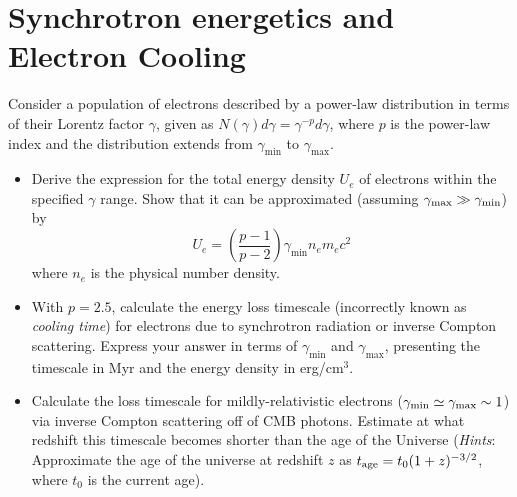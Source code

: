 \section{Synchrotron energetics and Electron Cooling}

Consider a population of electrons described by a power-law distribution in terms of their Lorentz factor $\gamma$, given as $N(\gamma)d\gamma = \gamma^{-p}d\gamma$, where $p$ is the power-law index and the distribution extends from $\gamma_{\text{min}}$ to $\gamma_{\text{max}}$.

\begin{itemize}
\item Derive the expression for the total energy density $U_e$ of electrons within the specified $\gamma$ range. Show that it can be approximated (assuming $\gamma_{\rm max} \gg \gamma_{\rm min}$) by $$U_e = \left(\frac{p-1}{p-2}\right) \gamma_{\text{min}} n_e m_e c^2$$
%
where $n_e$ is the physical number density.

\item With $p = 2.5$, calculate the energy loss timescale (incorrectly known as \emph{cooling time}) for electrons due to synchrotron radiation or inverse Compton scattering. Express your answer in terms of $\gamma_{\text{min}}$ and $\gamma_{\text{max}}$, presenting the timescale in Myr and the energy density in erg/cm$^3$.

\item Calculate the loss timescale for mildly-relativistic electrons ($\gamma_{\rm min} \simeq \gamma_{\rm max} \sim 1$) via inverse Compton scattering off of CMB photons. Estimate at what redshift this timescale becomes shorter than the age of the Universe (\emph{Hints}: Approximate the age of the universe at redshift $z$ as $t_{\rm age} = t_0 (1+z)^{-3/2}$, where $t_0$ is the current age).

\end{itemize}